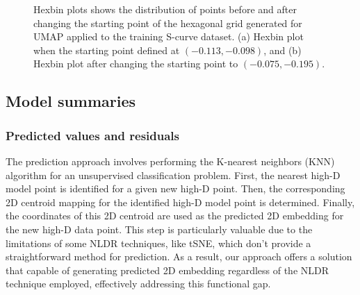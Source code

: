 \documentclass[
  12pt]{article}
\begin{document}
\begin{figure}[H]


\caption{\label{fig-scurveshifthexgrids}Hexbin plots shows the
distribution of points before and after changing the starting point of
the hexagonal grid generated for UMAP applied to the training S-curve
dataset. (a) Hexbin plot when the starting point defined at
\((-0.113, -0.098)\), and (b) Hexbin plot after changing the starting
point to \((-0.075, -0.195)\).}

\end{figure}%

\subsection{Model summaries}\label{sec-summary}

\subsubsection{Predicted values and
residuals}\label{predicted-values-and-residuals}

The prediction approach involves performing the K-nearest neighbors
(KNN) algorithm for an unsupervised classification problem. First, the
nearest high-D model point is identified for a given new high-D point.
Then, the corresponding 2D centroid mapping for the identified high-D
model point is determined. Finally, the coordinates of this 2D centroid
are used as the predicted 2D embedding for the new high-D data point.
This step is particularly valuable due to the limitations of some NLDR
techniques, like tSNE, which don't provide a straightforward method for
prediction. As a result, our approach offers a solution that capable of
generating predicted 2D embedding regardless of the NLDR technique
employed, effectively addressing this functional gap.
\end{document}
